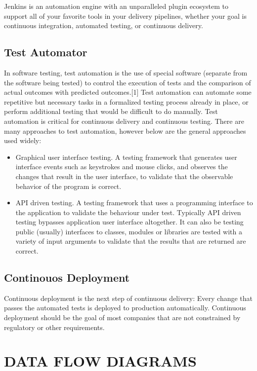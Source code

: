 \documentclass[12pt,a4paper,oneside]{report}
\begin{document}
{Jenkins is an automation engine with an unparalleled plugin ecosystem to support all of your favorite tools in your delivery pipelines, whether your goal is continuous integration, automated testing, or continuous delivery. 
\subsection{Test Automator}
\par In software testing, test automation is the use of special software (separate from the software being tested) to control the execution of tests and the comparison of actual outcomes with predicted outcomes.[1] Test automation can automate some repetitive but necessary tasks in a formalized testing process already in place, or perform additional testing that would be difficult to do manually. Test automation is critical for continuous delivery and continuous testing. There are many approaches to test automation, however below are the general approaches used widely:

\begin{itemize}
\item Graphical user interface testing. A testing framework that generates user interface events such as keystrokes and mouse clicks, and observes the changes that result in the user interface, to validate that the observable behavior of the program is correct.
\item API driven testing. A testing framework that uses a programming interface to the application to validate the behaviour under test. Typically API driven testing bypasses application user interface altogether. It can also be testing public (usually) interfaces to classes, modules or libraries are tested with a variety of input arguments to validate that the results that are returned are correct.
\end{itemize}


\subsection{Continouos Deployment}
\par Continuous deployment is the next step of continuous delivery: Every change that passes the automated tests is deployed to production automatically. Continuous deployment should be the goal of most companies that are not constrained by regulatory or other requirements.


\newpage
\section{DATA FLOW DIAGRAMS}
}
\end{document}
